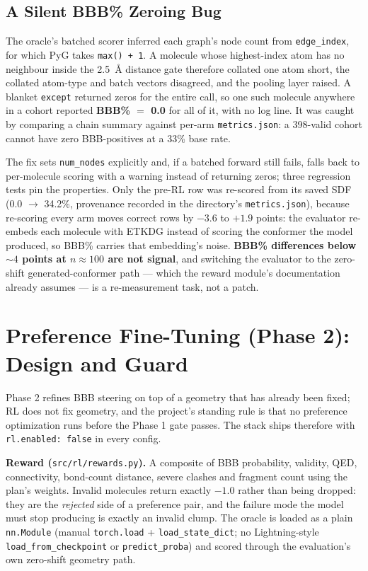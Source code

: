 \documentclass[12pt, a4paper]{article}
\begin{document}
\subsection{A Silent BBB\% Zeroing Bug}

The oracle's batched scorer inferred each graph's node count from
\texttt{edge\_index}, for which PyG takes \texttt{max() + 1}. A molecule whose
highest-index atom has no neighbour inside the 2.5~\AA{} distance gate
therefore collated one atom short, the collated atom-type and batch vectors
disagreed, and the pooling layer raised. A blanket \texttt{except} returned
zeros for the entire call, so one such molecule anywhere in a cohort reported
\textbf{BBB\% $=$ 0.0} for all of it, with no log line. It was caught by
comparing a chain summary against per-arm \texttt{metrics.json}: a 398-valid
cohort cannot have zero BBB-positives at a 33\% base rate.

The fix sets \texttt{num\_nodes} explicitly and, if a batched forward still
fails, falls back to per-molecule scoring with a warning instead of returning
zeros; three regression tests pin the properties. Only the pre-RL row was
re-scored from its saved SDF (0.0 $\rightarrow$ 34.2\%, provenance recorded in
the directory's \texttt{metrics.json}), because re-scoring every arm moves
correct rows by $-3.6$ to $+1.9$ points: the evaluator re-embeds each molecule
with ETKDG instead of scoring the conformer the model produced, so BBB\%
carries that embedding's noise. \textbf{BBB\% differences below ${\sim}4$
points at $n \approx 100$ are not signal}, and switching the evaluator to the
zero-shift generated-conformer path --- which the reward module's documentation
already assumes --- is a re-measurement task, not a patch.

\section{Preference Fine-Tuning (Phase 2): Design and Guard}
\label{sec:rl}

Phase 2 refines BBB steering on top of a geometry that has already been fixed;
RL does not fix geometry, and the project's standing rule is that no preference
optimization runs before the Phase 1 gate passes. The stack ships therefore
with \texttt{rl.enabled: false} in every config.

\textbf{Reward (}\texttt{src/rl/rewards.py}\textbf{).} A composite of BBB
probability, validity, QED, connectivity, bond-count distance, severe clashes
and fragment count using the plan's weights. Invalid molecules return exactly
$-1.0$ rather than being dropped: they are the \emph{rejected} side of a
preference pair, and the failure mode the model must stop producing is exactly
an invalid clump. The oracle is loaded as a plain \texttt{nn.Module}
(manual \texttt{torch.load} + \texttt{load\_state\_dict}; no
Lightning-style \texttt{load\_from\_checkpoint} or \texttt{predict\_proba})
and scored through the evaluation's own zero-shift geometry path.
\end{document}
